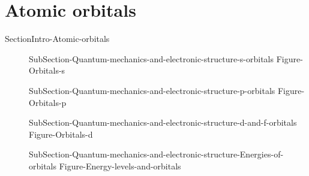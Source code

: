 \documentclass[main.tex]{subfiles}
\newcommand\chapterlabel{Ch-Table}\setcounter{figurenewcounter}{0}\setcounter{tablenewcounter}{0}\setcounter{formulanewcounter}{0}\chapterpicture{../{\chapterlabel}/figure1}\chapterpicturelabel{PxFuel}
\begin{document}
{ 

 

\section{Atomic orbitals}{SectionIntro-Atomic-orbitals} 
\sloppy\begin{description}
\item[] {SubSection-Quantum-mechanics-and-electronic-structure-s-orbitals} 
 {Figure-Orbitals-s}
\item[] {SubSection-Quantum-mechanics-and-electronic-structure-p-orbitals}
 {Figure-Orbitals-p}
\item[] {SubSection-Quantum-mechanics-and-electronic-structure-d-and-f-orbitals}
{Figure-Orbitals-d}
\item[] {SubSection-Quantum-mechanics-and-electronic-structure-Energies-of-orbitals}
{Figure-Energy-levels-and-orbitals}
\end{description}



}
\end{document}
